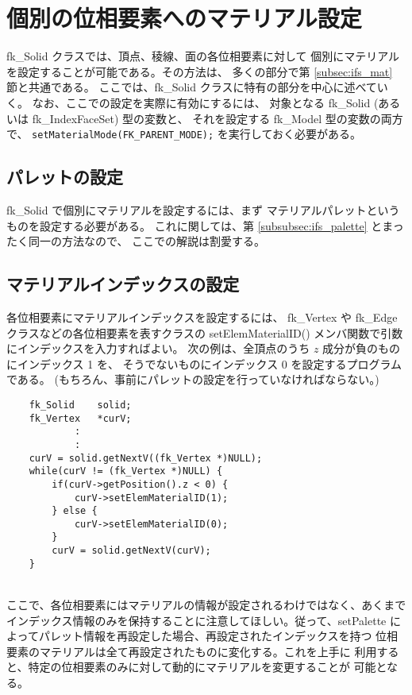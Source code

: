 \section{個別の位相要素へのマテリアル設定}
fk\_Solid クラスでは、頂点、稜線、面の各位相要素に対して
個別にマテリアルを設定することが可能である。その方法は、
多くの部分で第 \ref{subsec:ifs_mat} 節と共通である。
ここでは、fk\_Solid クラスに特有の部分を中心に述べていく。
なお、ここでの設定を実際に有効にするには、
対象となる fk\_Solid (あるいは fk\_IndexFaceSet) 型の変数と、
それを設定する fk\_Model 型の変数の両方で、
\verb+setMaterialMode(FK_PARENT_MODE);+ を実行しておく必要がある。

\subsection{パレットの設定} \label{subsubsec:solid_palette}
fk\_Solid で個別にマテリアルを設定するには、まず
マテリアルパレットというものを設定する必要がある。
これに関しては、第 \ref{subsubsec:ifs_palette} とまったく同一の方法なので、
ここでの解説は割愛する。

\subsection{マテリアルインデックスの設定} \label{subsubsec:solid_matid}
各位相要素にマテリアルインデックスを設定するには、
fk\_Vertex や fk\_Edge クラスなどの各位相要素を表すクラスの
setElemMaterialID() メンバ関数で引数にインデックスを入力すればよい。
次の例は、全頂点のうち \(z\) 成分が負のものにインデックス 1 を、
そうでないものにインデックス 0 を設定するプログラムである。
(もちろん、事前にパレットの設定を行っていなければならない。)
\\
\begin{breakbox}
\begin{verbatim}
    fk_Solid    solid;
    fk_Vertex   *curV;
            :
            :
    curV = solid.getNextV((fk_Vertex *)NULL);
    while(curV != (fk_Vertex *)NULL) {
        if(curV->getPosition().z < 0) {
            curV->setElemMaterialID(1);
        } else {
            curV->setElemMaterialID(0);
        }
        curV = solid.getNextV(curV);
    }
\end{verbatim}
\end{breakbox}
~ \\
ここで、各位相要素にはマテリアルの情報が設定されるわけではなく、あくまで
インデックス情報のみを保持することに注意してほしい。従って、setPalette
によってパレット情報を再設定した場合、再設定されたインデックスを持つ
位相要素のマテリアルは全て再設定されたものに変化する。これを上手に
利用すると、特定の位相要素のみに対して動的にマテリアルを変更することが
可能となる。

